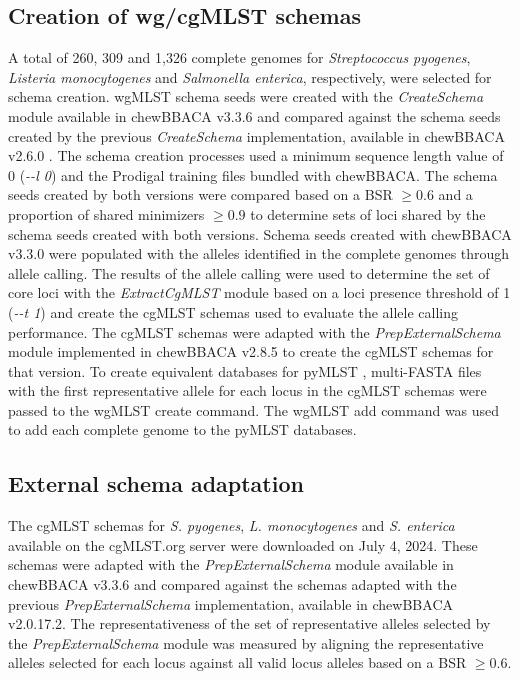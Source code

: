 \subsection{Creation of wg/cgMLST schemas} \label{ssec:ch2_methods_ssec3}

A total of 260, 309 and 1,326 complete genomes for \textit{Streptococcus pyogenes}, \textit{Listeria monocytogenes} and \textit{Salmonella enterica}, respectively, were selected for schema creation. \ac{wgMLST} schema seeds were created with the \textit{CreateSchema} module available in chewBBACA v3.3.6 and compared against the schema seeds created by the previous \textit{CreateSchema} implementation, available in chewBBACA v2.6.0 \citep{silva_chewbbaca_2018}. The schema creation processes used a minimum sequence length value of 0 (\textit{-{}-l 0}) and the Prodigal \citep{hyatt_prodigal_2010} training files bundled with chewBBACA. The schema seeds created by both versions were compared based on a \ac{BSR} $\geq0.6$ and a proportion of shared minimizers $\geq0.9$ to determine sets of loci shared by the schema seeds created with both versions. Schema seeds created with chewBBACA v3.3.0 were populated with the alleles identified in the complete genomes through allele calling. The results of the allele calling were used to determine the set of core loci with the \textit{ExtractCgMLST} module based on a loci presence threshold of 1 (\textit{-{}-t 1}) and create the \ac{cgMLST} schemas used to evaluate the allele calling performance. The \ac{cgMLST} schemas were adapted with the \textit{PrepExternalSchema} module implemented in chewBBACA v2.8.5 to create the \ac{cgMLST} schemas for that version. To create equivalent databases for pyMLST \citep{biguenet_introduction_2023}, multi-FASTA files with the first representative allele for each locus in the \ac{cgMLST} schemas were passed to the \ac{wgMLST} create command. The \ac{wgMLST} add command was used to add each complete genome to the pyMLST databases.

\subsection{External schema adaptation} \label{ssec:ch2_methods_ssec4}

The \ac{cgMLST} schemas for \textit{S. pyogenes}, \textit{L. monocytogenes} and \textit{S. enterica} available on the cgMLST.org server \citep{noauthor_cgmlstorg_nodate} were downloaded on July 4, 2024. These schemas were adapted with the \textit{PrepExternalSchema} module available in chewBBACA v3.3.6 and compared against the schemas adapted with the previous \textit{PrepExternalSchema} implementation, available in chewBBACA v2.0.17.2. The representativeness of the set of representative alleles selected by the \textit{PrepExternalSchema} module was measured by aligning the representative alleles selected for each locus against all valid locus alleles based on a \ac{BSR} $\geq0.6$.

